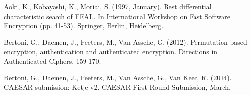 %
%
%


%
\begin{thebibliography}{8}













Aoki, K., Kobayashi, K.,  Moriai, S. (1997, January). Best differential characteristic search of FEAL. In International Workshop on Fast Software Encryption (pp. 41-53). Springer, Berlin, Heidelberg.

Bertoni, G., Daemen, J., Peeters, M.,  Van Assche, G. (2012). Permutation-based encryption, authentication and authenticated encryption. Directions in Authenticated Ciphers, 159-170.

Bertoni, G., Daemen, J., Peeters, M., Van Assche, G.,  Van Keer, R. (2014). CAESAR submission: Ketje v2. CAESAR First Round Submission, March.


\end{thebibliography}
